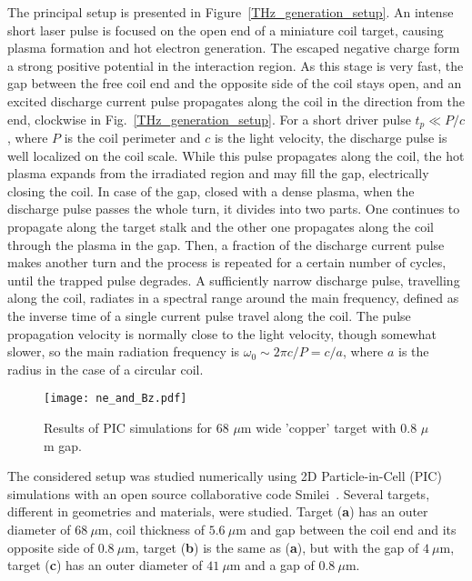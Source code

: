 \documentclass[aps,prl,twocolumn,superscriptaddress]{revtex4-1}
\begin{document}
The principal setup is presented in Figure~\ref{THz_generation_setup}. An intense short laser pulse is focused on the open end of a miniature coil target, causing plasma formation and hot electron generation. The escaped negative charge form a strong positive potential in the interaction region. As this stage is very fast, the gap between the free coil end and the opposite side of the coil stays open, and an excited discharge current pulse propagates along the coil in the direction from the end, clockwise in Fig.~\ref{THz_generation_setup}. 
For a short driver pulse $t_p \ll {P}/{c}$, where $P$ is the coil perimeter and $c$ is the light velocity, the discharge pulse is well localized on the coil scale. While this pulse propagates along the coil, the hot plasma expands from the irradiated region and may fill the gap, electrically closing the coil. In case of the gap, closed with a dense plasma, when the discharge pulse passes the whole turn, it divides into two parts. One continues to propagate along the target stalk and the other one propagates along the coil through the plasma in the gap. Then, a fraction of the discharge current pulse makes another turn and the process is repeated for a certain number of cycles, until the trapped pulse degrades. A sufficiently narrow discharge pulse, travelling along the coil, radiates in a spectral range around the main frequency, defined as the inverse time of a single current pulse travel along the coil. The pulse propagation velocity is normally close to the light velocity, though somewhat slower, so the main radiation frequency is $\omega_0\sim 2\pi c/P = c/a$, where $a$ is the radius in the case of a circular coil.  
\begin{figure}
    \centering
    \texttt{[image: ne\_and\_Bz.pdf]}
    \caption{Results of PIC simulations for 68 $\mu$m wide 'copper' target with 0.8 $\mu$m gap.}
    \label{PIC_results}
\end{figure}

The considered setup was studied numerically using 2D Particle-in-Cell (PIC) simulations with an open source collaborative code Smilei~\cite{Smilei}. Several targets, different in geometries and materials, were studied. Target (\textbf{a}) has an outer diameter of $68~\mu$m, coil thickness of $5.6~\mu$m and gap between the coil end and its opposite side of $0.8~\mu$m, target (\textbf{b}) is the same as (\textbf{a}), but with the gap of $4~\mu$m, target (\textbf{c}) has an outer diameter of  $41~\mu$m and a gap of $0.8~\mu$m. 
\end{document}
